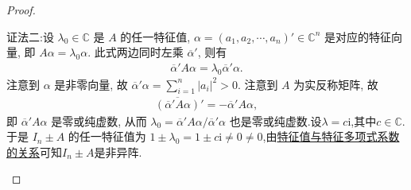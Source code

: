 \documentclass[../../main.tex]{subfiles}%
\begin{document}
\begin{proof}
\begin{enumerate}[(1)]
{\color{blue}证法二:}设 $\lambda_0 \in \mathbb{C}$ 是 $A$ 的任一特征值, $\alpha = (a_1, a_2, \cdots, a_n)' \in \mathbb{C}^n$ 是对应的特征向量, 即 $A\alpha = \lambda_0 \alpha$. 此式两边同时左乘 $\overline{\alpha }' $, 则有
\begin{align*}
\overline{\alpha }'  A \alpha = \lambda_0 \overline{\alpha }'  \alpha.
\end{align*}
注意到 $\alpha$ 是非零向量, 故 $\overline{\alpha }' \alpha = \sum_{i=1}^n |a_i|^2 > 0$. 注意到 $A$ 为实反称矩阵, 故
\begin{align*}
\overline{(\overline{\alpha }'  A\alpha )}' = -\overline{\alpha }' A \alpha,
\end{align*}
即 $\overline{\alpha }'  A \alpha$ 是零或纯虚数, 从而 $\lambda_0 = \overline{\alpha }'  A \alpha / \overline{\alpha }'  \alpha$ 也是零或纯虚数.设$\lambda=c\mathrm{i}$,其中$c\in \mathbb{C}$.
于是 $I_n \pm A$ 的任一特征值为 $1 \pm \lambda_0 = 1 \pm c\mathrm{i} \neq 0\ne 0$,由\hyperref[proposition:特征值与特征多项式系数的关系]{特征值与特征多项式系数的关系}可知$I_n\pm A$是非异阵.
\end{enumerate}
\end{proof}
\end{document}
